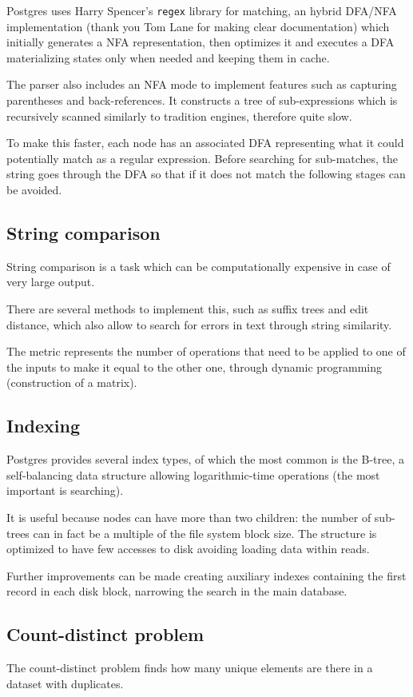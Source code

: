Postgres uses Harry Spencer's \texttt{regex} library for matching, an hybrid DFA/NFA implementation (thank you Tom Lane for making clear documentation) which initially generates a NFA representation, then optimizes it and executes a DFA materializing states only when needed and keeping them in cache. 

The parser also includes an NFA mode to implement features such as capturing parentheses and back-references. It constructs a tree of sub-expressions which is recursively scanned similarly to tradition engines, therefore quite slow. 

To make this faster, each node has an associated DFA representing what it could potentially match as a regular expression. Before searching for sub-matches, the string goes through the DFA so that if it does not match the following stages can be avoided.

\subsection{String comparison}
String comparison is a task which can be computationally expensive in case of very large output. 

There are several methods to implement this, such as suffix trees and edit distance, which also allow to search for errors in text through string similarity. 

The metric represents the number of operations that need to be applied to one of the inputs to make it equal to the other one, through dynamic programming (construction of a matrix). 

\subsection{Indexing}
Postgres provides several index types, of which the most common is the B-tree, a self-balancing data structure allowing logarithmic-time operations (the most important is searching).

It is useful because nodes can have more than two children: the number of sub-trees can in fact be a multiple of the file system block size. The structure is optimized to have few accesses to disk avoiding loading data within reads.

Further improvements can be made creating auxiliary indexes containing the first record in each disk block, narrowing the search in the main database.

\subsection{Count-distinct problem}
The count-distinct problem finds how many unique elements are there in a dataset with duplicates. 

